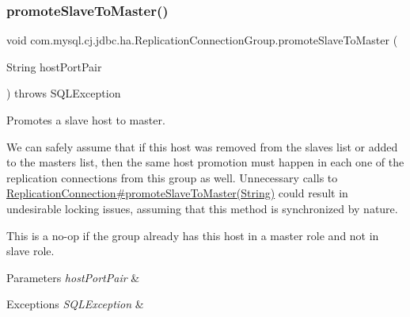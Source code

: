 \mbox{\label{classcom_1_1mysql_1_1cj_1_1jdbc_1_1ha_1_1_replication_connection_group_a15c7ea25c34ea77f3dedaa68eb05075d}} 
\subsubsection{\texorpdfstring{promote\+Slave\+To\+Master()}{promoteSlaveToMaster()}}
{\footnotesize\ttfamily void com.\+mysql.\+cj.\+jdbc.\+ha.\+Replication\+Connection\+Group.\+promote\+Slave\+To\+Master (\begin{DoxyParamCaption}\item[{String}]{host\+Port\+Pair }\end{DoxyParamCaption}) throws S\+Q\+L\+Exception}

Promotes a slave host to master.

We can safely assume that if this host was removed from the slaves list or added to the masters list, then the same host promotion must happen in each one of the replication connections from this group as well. Unnecessary calls to \mbox{\hyperlink{interfacecom_1_1mysql_1_1cj_1_1jdbc_1_1ha_1_1_replication_connection_abeccff634ae5dc9f96295b012c458500}{Replication\+Connection\#promote\+Slave\+To\+Master(\+String)}} could result in undesirable locking issues, assuming that this method is synchronized by nature.

This is a no-\/op if the group already has this host in a master role and not in slave role.


\begin{DoxyParams}{Parameters}
{\em host\+Port\+Pair} & \\
\hline
\end{DoxyParams}

\begin{DoxyExceptions}{Exceptions}
{\em S\+Q\+L\+Exception} & \\
\hline
\end{DoxyExceptions}
\mbox{\label{classcom_1_1mysql_1_1cj_1_1jdbc_1_1ha_1_1_replication_connection_group_a3071d0f8628bcc858c1043648dfa5cc6}} 
